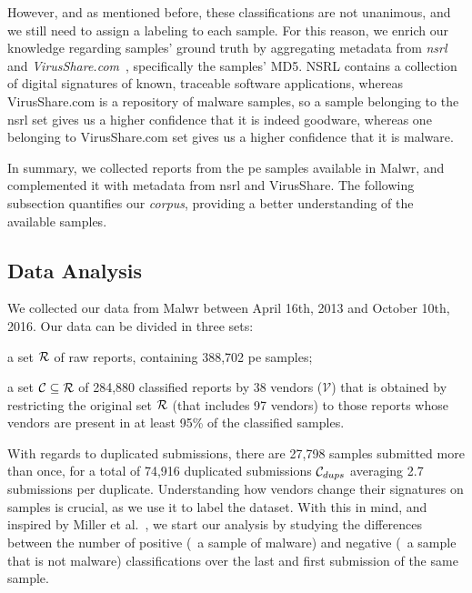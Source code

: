 However, and as mentioned before, these classifications are not unanimous, and we still need to assign a labeling to each sample.
For this reason, we enrich our knowledge regarding samples' ground truth by aggregating metadata from \emph{\gls{nsrl}}~\cite{tool:nsrl} and \emph{VirusShare.com}~\cite{tool:virusshare}, specifically the samples' MD5. 
NSRL contains a collection of digital signatures of known, traceable software applications, whereas VirusShare.com is a repository of malware samples, so a sample belonging to the \gls{nsrl} set gives us a higher confidence that it is indeed goodware, whereas one belonging to VirusShare.com set gives us a higher confidence that it is malware. 

In summary, we collected reports from the \gls{pe} samples available in Malwr, and complemented it with metadata from \gls{nsrl} and VirusShare. The following subsection quantifies our \textit{corpus}, providing a better understanding of the available samples.


\subsection{Data Analysis}\label{sub_sec:data_analysis}
We collected our data from Malwr between April 16th, 2013 and October 10th, 2016.
Our data can be divided in three sets:
\begin{enumerate*}[label={\alph*)},font={\color{red!80!black}\bfseries}]
	\item a set $\mathcal{R}$ of raw reports, containing 388,702 \gls{pe} samples; 
	\item a set $\mathcal{C}\subseteq\mathcal{R}$ of 284,880 classified reports by 38 vendors ($\mathcal{V}$) that is obtained by restricting the original set $\mathcal{R}$ (that includes 97 vendors) to those reports whose vendors are present in at least 95\% of the classified samples.
\end{enumerate*}

With regards to duplicated submissions, there are 27,798 samples submitted more than once, for a total of 74,916 duplicated submissions $\mathcal{C}_{dups}$ averaging 2.7 submissions per duplicate.
Understanding how vendors change their signatures on samples is crucial, as we use it to label the dataset. With this in mind, and inspired by Miller et al.~\cite{miller:rev_int}, we start our analysis by studying the differences between the number of positive (\ie\ a sample of malware) and negative (\ie\ a sample that is not malware) classifications over the last and first submission of the same sample.


